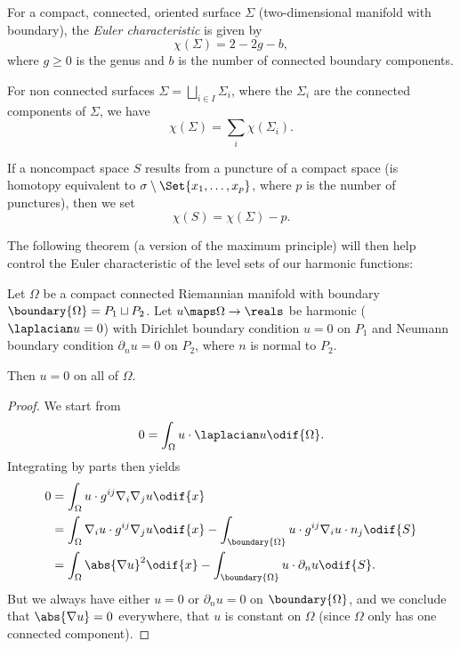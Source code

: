 \documentclass[titlepage,numbers=noenddot,oneside,%
cleardoublepage=empty,paper=a4,fontsize=11pt,%
english,%
]{scrartcl}
\begin{document}
\begin{definition}
    For a compact, connected, oriented surface \( \Sigma \) (two-dimensional manifold with boundary), the \emph{Euler characteristic} is given by
    \begin{equation}
        \chi(\Sigma)=2-2g-b,\label{eq:def_euler_characteristic}
    \end{equation}
    where \( g\geq 0 \) is the genus and \( b \) is the number of connected boundary components.

    For non connected surfaces \( \Sigma=\bigsqcup_{i\in I} \Sigma_i \), where the \( \Sigma_i \) are the connected components of \( \Sigma \), we have
    \begin{equation*}
        \chi(\Sigma)=\sum_{i}\chi(\Sigma_i).
    \end{equation*}

    If a noncompact space \( S \) results from a puncture of a compact space (is homotopy equivalent to \( \sigma\setminus \Set{x_1,\dotsc,x_p} \), where \( p \) is the number of punctures), then we set
    \begin{equation}
        \chi(S)=\chi(\Sigma)-p.\label{eq:def_euler_characteristic_noncompact}
    \end{equation}
\end{definition}
The following theorem (a version of the maximum principle) will then help control the Euler characteristic of the level sets of our harmonic functions:
\begin{theorem}\label{thm:maximum_principle}
 Let \( \Omega \) be a compact connected Riemannian manifold with boundary \( \boundary{\Omega}=P_1\sqcup P_2 \). Let \( u\maps \Omega\to \reals \) be harmonic (\ie \( \laplacian u=0 \)) with Dirichlet boundary condition \( u= 0 \) on \( P_1 \) and Neumann boundary condition \( \partial_n u=0 \) on \( P_2 \), where \( n \) is normal to \( P_2 \).

 Then \( u=0 \) on all of \( \Omega \).
\end{theorem}
\begin{proof}
    We start from
    \begin{equation*}
        0=\int_\Omega u\cdot \laplacian u\odif{\Omega}.
    \end{equation*}
    Integrating by parts then yields
    \begin{align*}
        0&=\int_\Omega u\cdot g^{ij}\nabla_i \nabla_j u\odif{x}\\
        &=\int_\Omega \nabla_i u\cdot g^{ij} \nabla_j u\odif{x}-\int_{\boundary{\Omega}}u\cdot g^{ij}\nabla_i u \cdot n_j \odif{S}\\
        &=\int_\Omega \abs{\nabla u}^2\odif{x}-\int_{\boundary{\Omega}}u\cdot \partial_n u\odif{S}.
    \end{align*}
    But we always have either \( u=0 \) or \( \partial_n u=0 \) on \( \boundary{\Omega} \), and we conclude that \( \abs{\nabla u}=0 \) everywhere, \ie that \( u \) is constant on \( \Omega \) (since \( \Omega \) only has one connected component).
\end{proof}
\end{document}
